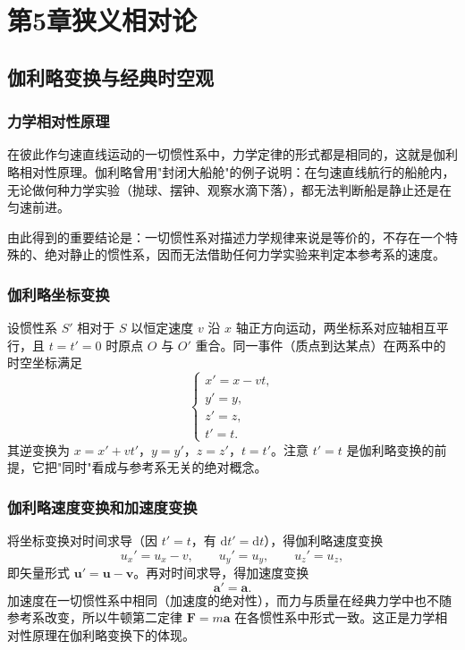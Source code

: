 \chapter{第5章\texorpdfstring{\hspace{0.5em}}{ }狭义相对论}

\section{伽利略变换与经典时空观}
    \subsection{力学相对性原理}
    在彼此作匀速直线运动的一切惯性系中，力学定律的形式都是相同的，这就是伽利略相对性原理。伽利略曾用"封闭大船舱"的例子说明：在匀速直线航行的船舱内，无论做何种力学实验（抛球、摆钟、观察水滴下落），都无法判断船是静止还是在匀速前进。

    由此得到的重要结论是：一切惯性系对描述力学规律来说是等价的，不存在一个特殊的、绝对静止的惯性系，因而无法借助任何力学实验来判定本参考系的速度。

    \subsection{伽利略坐标变换}
    设惯性系 $S'$ 相对于 $S$ 以恒定速度 $v$ 沿 $x$ 轴正方向运动，两坐标系对应轴相互平行，且 $t=t'=0$ 时原点 $O$ 与 $O'$ 重合。同一事件（质点到达某点）在两系中的时空坐标满足
    \[
    \begin{cases}
    x'=x-vt,\\
    y'=y,\\
    z'=z,\\
    t'=t.
    \end{cases}
    \]
    其逆变换为 $x=x'+vt'$，$y=y'$，$z=z'$，$t=t'$。注意 $t'=t$ 是伽利略变换的前提，它把"同时"看成与参考系无关的绝对概念。

    \subsection{伽利略速度变换和加速度变换}
    将坐标变换对时间求导（因 $t'=t$，有 $\mathrm{d}t'=\mathrm{d}t$），得伽利略速度变换
    \[
    u_x'=u_x-v,\qquad u_y'=u_y,\qquad u_z'=u_z,
    \]
    即矢量形式 $\boldsymbol{u}'=\boldsymbol{u}-\boldsymbol{v}$。再对时间求导，得加速度变换
    \[
    \boldsymbol{a}'=\boldsymbol{a}.
    \]
    加速度在一切惯性系中相同（加速度的绝对性），而力与质量在经典力学中也不随参考系改变，所以牛顿第二定律 $\boldsymbol{F}=m\boldsymbol{a}$ 在各惯性系中形式一致。这正是力学相对性原理在伽利略变换下的体现。

